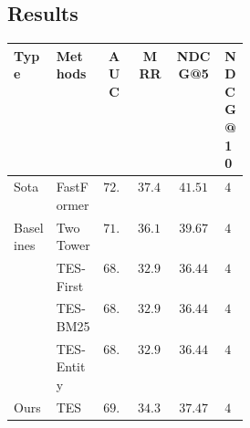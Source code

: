 \documentclass[sigconf,anonymous]{acmart}
\begin{document}
\subsection{Results}

\begin{table}
  \centering
  \begin{tabular}{lp{0.2\linewidth}cccp{0.1\linewidth}}
    \toprule
    \textbf{Type} & \textbf{Methods}&\textbf{AUC}&\textbf{MRR}&\textbf{NDCG@5}&\textbf{NDCG@10}\\
    \midrule
    \multirow{1}{0.15\linewidth}{Sota}
    &FastFormer & $\mathbf{72.68}$ & $\mathbf{37.45}$ & $\mathbf{41.51}$ & $\mathbf{46.84}$\\
    \midrule
    \multirow{4}{0.15\linewidth}{Baselines}
    &Two Tower& ${71.43}$ & ${36.16}$ & ${39.67}$ & ${45.29}$\\
    &TES-First & ${68.00}$ & ${32.91}$ & ${36.44}$ & ${42.86}$\\
    &TES-BM25 & ${68.00}$ & ${32.91}$ & ${36.44}$ & ${42.86}$\\
    &TES-Entity & ${68.00}$ & ${32.91}$ & ${36.44}$ & ${42.86}$\\
    \midrule
    \multirow{1}{0.15\linewidth}{Ours}
    &TES & $69.62$ & $34.30$ & ${37.47}$ & ${43.21}$\\
    \bottomrule
  \end{tabular}
\end{table}
\clearpage



\end{document}
